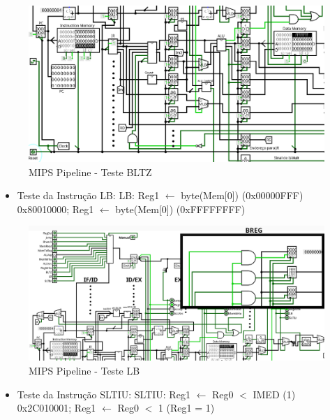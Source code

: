 \documentclass{report}
\begin{document}
        \begin{figure}[h!]
            \centering
            \includegraphics[width=\linewidth]{images/prints/Pipeline/Teste BLTZ.png}
            \caption{\label{print:pipeline_test_BLTZ} MIPS Pipeline - Teste BLTZ}
        \end{figure}

        \clearpage
        \begin{itemize}
            \item Teste da Instrução LB:
                \subitem LB: Reg1 $\leftarrow$ byte(Mem[0]) (0x00000FFF)
                \subitem 0x80010000; Reg1 $\leftarrow$ byte(Mem[0]) (0xFFFFFFFF)
        \end{itemize}
        
        \begin{figure}[h!]
            \centering
            \includegraphics[width=\linewidth]{images/prints/Pipeline/Teste LB.png}
            \caption{\label{print:pipeline_test_LB} MIPS Pipeline - Teste LB}
        \end{figure}

        \begin{itemize}
            \item Teste da Instrução SLTIU:
                \subitem SLTIU: Reg1 $\leftarrow$ Reg0 $<$ IMED (1)
                \subitem 0x2C010001; Reg1 $\leftarrow$ Reg0 $<$ 1 (Reg1 = 1)
        \end{itemize}
        
\end{document}
